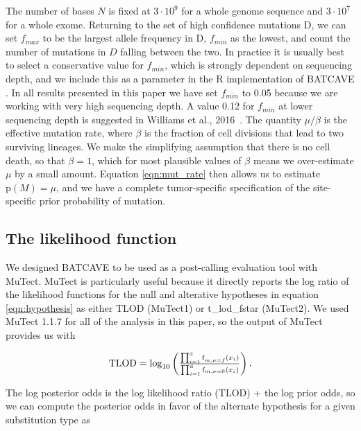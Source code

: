 \documentclass[a4,center,fleqn]{NAR}
\newcommand{\batcave}{BATCAVE }
\begin{document}
The number of bases $N$ is fixed at $3\cdot10^9$ for a whole genome sequence and $3\cdot10^7$ for a whole exome.
Returning to the set of high confidence mutations $\mathrm{D}$, we can set $f_{max}$ to be the largest allele frequency in $\mathrm{D}$, $f_{min}$ as the lowest, and count the number of mutations in $D$ falling between the two.
In practice it is usually best to select a conservative value for $f_{min}$, which is strongly dependent on sequencing depth, and we include this as a parameter in the R implementation of \batcave.
In all results presented in this paper we have set $f_{min}$ to 0.05 because we are working with very high sequencing depth.
A value 0.12 for $f_{min}$ at lower sequencing depth is suggested in Williams et al., 2016~\citep{Williams2016}.
The quantity $\mu/\beta$ is the effective mutation rate, where $\beta$ is the fraction of cell divisions that lead to two surviving lineages.
We make the simplifying assumption that there is no cell death, so that $\beta = 1$, which for most plausible values of $\beta$ means we over-estimate $\mu$ by a small amount.
Equation \ref{eqn:mut_rate} then allows us to estimate $\mathrm{p}(M) = \mu$, and we have a complete tumor-specific specification of the site-specific prior probability of mutation.

\subsection{The likelihood function}
We designed \batcave to be used as a post-calling evaluation tool with MuTect.
MuTect is particularly useful because it directly reports the log ratio of the likelihood functions for the null and alterative hypotheses in equation \ref{eqn:hypothesis} as either \textrm{TLOD} (MuTect1) or \textrm{t\_lod\_fstar} (MuTect2).
We used MuTect 1.1.7 for all of the analysis in this paper, so the output of MuTect provides us with

\begin{equation}
  \label{eqn:tlod}
    $$
    \mathrm{TLOD} = \mathrm{log}_{10}\left(\frac{\prod_{i=1}^{\mathrm{d}} \textrm{f}_{m,\nu = \hat{f}}(x_i)}{\prod_{i=1}^{\mathrm{d}} \textrm{f}_{m,\nu = 0}(x_i)}\right).
    $$
\end{equation}

The log posterior odds is the log likelihood ratio (\textrm{TLOD}) + the log prior odds, so we can compute the posterior odds in favor of the alternate hypothesis for a given substitution type as
\end{document}
